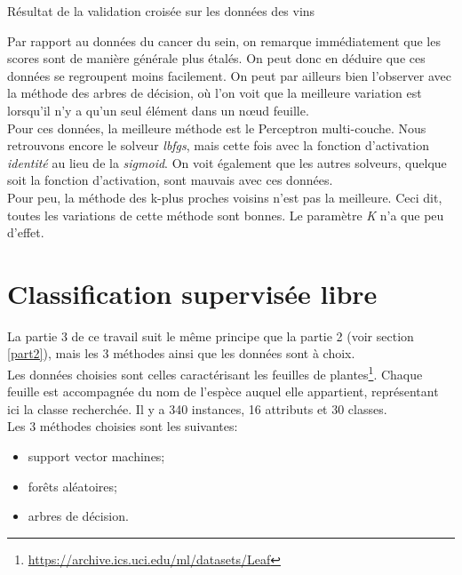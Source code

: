 \documentclass[11pt, a4paper]{article}
\begin{document}
\begin{table}[H]
    \begin{center}
    \end{center}
    \caption{Résultat de la validation croisée sur les données des vins}
    \label{Résultat de la validation croisée sur les données des vins}
\end{table}

Par rapport au données du cancer du sein,
on remarque immédiatement que les scores sont de manière générale plus étalés.
On peut donc en déduire que ces données se regroupent moins facilement.
On peut par ailleurs bien l'observer avec la méthode des arbres de décision,
où l'on voit que la meilleure variation est lorsqu'il n'y a qu'un seul élément dans un nœud feuille. \\

Pour ces données, la meilleure méthode est le Perceptron multi-couche.
Nous retrouvons encore le solveur \textit{lbfgs},
mais cette fois avec la fonction d'activation \textit{identité} au lieu de la \textit{sigmoid}.
On voit également que les autres solveurs, quelque soit la fonction d'activation, sont mauvais avec ces données. \\

Pour peu, la méthode des k-plus proches voisins n'est pas la meilleure.
Ceci dit, toutes les variations de cette méthode sont bonnes.
Le paramètre \textit{K} n'a que peu d'effet.

\newpage

\section{Classification supervisée libre}

La partie 3 de ce travail suit le même principe que la partie 2 (voir section \ref{part2}),
mais les 3 méthodes ainsi que les données sont à choix. \\

Les données choisies sont celles caractérisant les feuilles de plantes\footnote{\url{https://archive.ics.uci.edu/ml/datasets/Leaf}}.
Chaque feuille est accompagnée du nom de l'espèce auquel elle appartient, représentant ici la classe recherchée.
Il y a 340 instances, 16 attributs et 30 classes. \\

Les 3 méthodes choisies sont les suivantes:
\begin{itemize}
    \item support vector machines;
    \item forêts aléatoires;
    \item arbres de décision. \\
\end{itemize}
\end{document}
